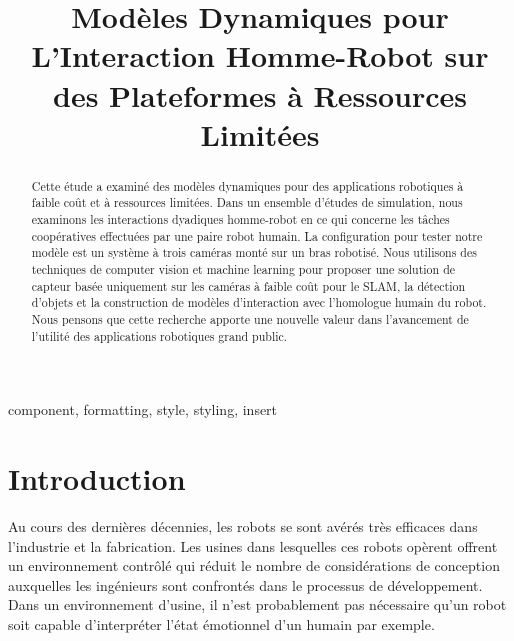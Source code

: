 \documentclass[conference]{IEEEtran}
\begin{document}
\title{Modèles Dynamiques pour L'Interaction Homme-Robot sur des Plateformes à Ressources Limitées\\
}

\author{
\and
{}
}

\maketitle

\begin{abstract}
Cette étude a examiné des modèles dynamiques pour des applications robotiques à faible coût et à ressources limitées. Dans un ensemble d'études de simulation, nous examinons les interactions dyadiques homme-robot en ce qui concerne les tâches coopératives effectuées par une paire robot humain. La configuration pour tester notre modèle est un système à trois caméras monté sur un bras robotisé. Nous utilisons des techniques de computer vision et machine learning pour proposer une solution de capteur basée uniquement sur les caméras à faible coût pour le SLAM, la détection d'objets et la construction de modèles d'interaction avec l'homologue humain du robot. Nous pensons que cette recherche apporte une nouvelle valeur dans l'avancement de l'utilité des applications robotiques grand public.
\end{abstract}

\begin{IEEEkeywords}
component, formatting, style, styling, insert
\end{IEEEkeywords}

\section{Introduction}
Au cours des dernières décennies, les robots se sont avérés très efficaces dans l'industrie et la fabrication\cite{b1}. Les usines dans lesquelles ces robots opèrent offrent un environnement contrôlé qui réduit le nombre de considérations de conception auxquelles les ingénieurs sont confrontés dans le processus de développement. Dans un environnement d'usine, il n'est probablement pas nécessaire qu'un robot soit capable d'interpréter l'état émotionnel d'un humain par exemple.
\end{document}
